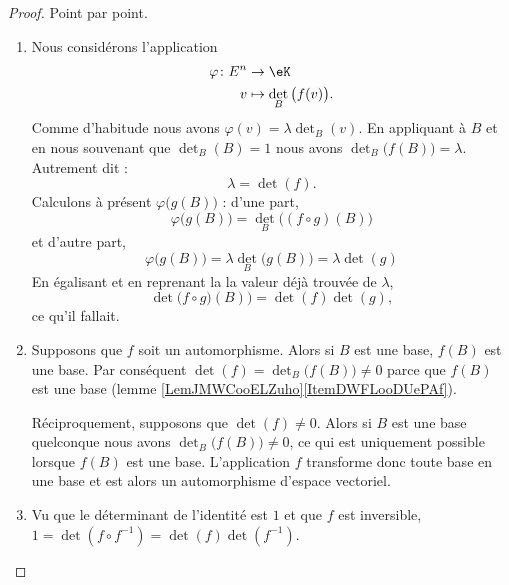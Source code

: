 \begin{proof}
    Point par point.
    \begin{enumerate}
        \item
            Nous considérons l'application
            \begin{equation}
                \begin{aligned}
                    \varphi\colon E^n&\to \eK \\
                    v&\mapsto \det_B\big( f(v) \big). 
                \end{aligned}
            \end{equation}
            Comme d'habitude nous avons \( \varphi(v)=\lambda\det_B(v)\). En appliquant à \( B\) et en nous souvenant que \( \det_B(B)=1\) nous avons
                $\det_B\big( f(B) \big)=\lambda$. Autrement dit :
                \begin{equation}
                    \lambda=\det(f).
                \end{equation}
            Calculons à présent \( \varphi\big( g(B) \big)\) : d'une part,
            \begin{equation}
                \varphi\big( g(B) \big)=\det_B\big( (f\circ g)(B) \big)
            \end{equation}
            et d'autre part,
            \begin{equation}
                \varphi\big( g(B) \big)=\lambda\det_B\big( g(B) \big)=\lambda\det(g)
            \end{equation}
            En égalisant et en reprenant la la valeur déjà trouvée de \( \lambda\),
            \begin{equation}
                \det\big(f\circ g)(B) \big)=\det(f)\det(g),
            \end{equation}
            ce qu'il fallait.
        \item
            Supposons que \( f\) soit un automorphisme. Alors si \( B\) est une base, \( f(B) \) est une base. Par conséquent \( \det(f)=\det_B\big( f(B) \big)\neq 0\) parce que \( f(B)\) est une base (lemme \ref{LemJMWCooELZuho}\ref{ItemDWFLooDUePAf}).

            Réciproquement, supposons que \( \det(f)\neq 0\). Alors si \( B\) est une base quelconque nous avons \( \det_B\big( f(B) \big)\neq 0\), ce qui est uniquement possible lorsque \( f(B)\) est une base. L'application \( f\) transforme donc toute base en une base et est alors un automorphisme d'espace vectoriel.
        \item
            Vu que le déterminant de l'identité est \( 1\) et que \( f\) est inversible, \( 1=\det(f\circ f^{-1})=\det(f)\det(f^{-1})\).
    \end{enumerate}
\end{proof}

